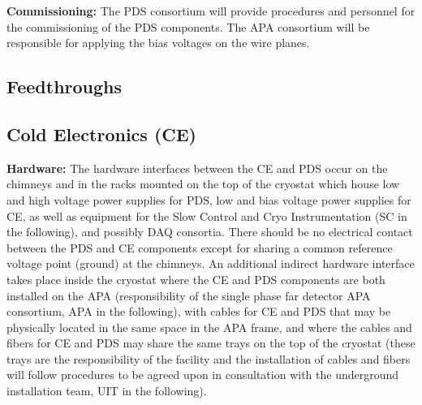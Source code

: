 
\textbf{Commissioning: }
The PDS consortium will provide procedures and personnel for the commissioning of the PDS components.
The APA consortium will be responsible for applying the bias voltages on the wire planes. 

\subsection{Feedthroughs}
\label{sec:fdsp-pd-intfc-feed}

\subsection{Cold Electronics (CE)}
\label{sec:fdsp-pd-intfc-feed}

\hspace{0.5cm}\textbf{Hardware: }The hardware interfaces between the CE and PDS occur on the chimneys and in the racks mounted on the top of the cryostat which house low and high voltage power supplies for PDS, low and bias voltage power supplies for CE, as well as equipment for the Slow Control and Cryo Instrumentation (SC in the following), and possibly DAQ consortia. There should be no electrical contact between the PDS and CE components except for sharing a common reference voltage point (ground) at the chimneys. An additional indirect hardware interface takes place inside the cryostat where the CE and PDS components are both installed on the APA (responsibility of the single phase far detector APA consortium, APA in the following), with cables for CE and PDS that may be physically located in the same space in the APA frame, and where the cables and fibers for CE and PDS may share the same trays on the top of the cryostat (these trays are the responsibility of the facility and the installation of cables and fibers will follow procedures to be agreed upon in consultation with the underground installation team, UIT in the following).

